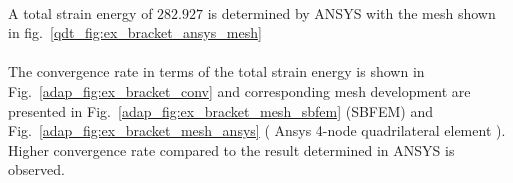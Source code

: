 \paragraph{}
A total strain energy of $282.927$ is determined by ANSYS with the mesh shown in fig.~\ref{qdt_fig:ex_bracket_ansys_mesh}












\paragraph{}
The convergence rate in terms of the total strain energy is shown in Fig.~\ref{adap_fig:ex_bracket_conv} and corresponding mesh development are presented in Fig.~\ref{adap_fig:ex_bracket_mesh_sbfem} (SBFEM) and Fig.~\ref{adap_fig:ex_bracket_mesh_ansys} ( Ansys 4-node quadrilateral element ).
Higher convergence rate compared to the result determined in ANSYS is observed.

